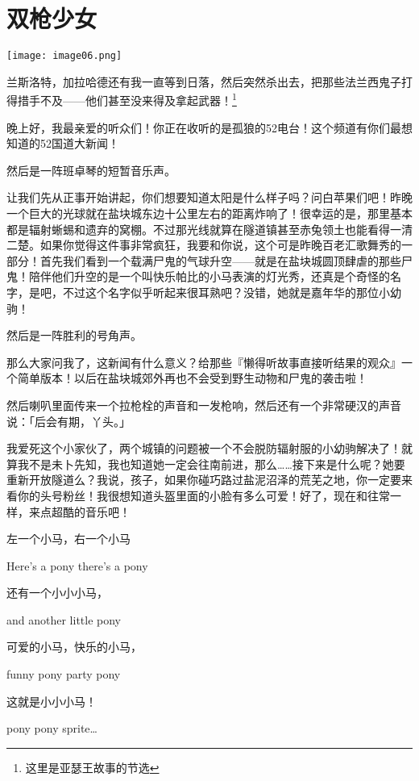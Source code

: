 \chapter{双枪少女}

\texttt{[image: image06.png]}


\begin{intro}
    兰斯洛特，加拉哈德还有我一直等到日落，然后突然杀出去，把那些法兰西鬼子打得措手不及——他们甚至没来得及拿起武器！\footnote{这里是亚瑟王故事的节选}
\end{intro}

{\rt 晚上好，我最亲爱的听众们！你正在收听的是孤狼的52电台！这个频道有你们最想知道的52国道大新闻！}

然后是一阵班卓琴的短暂音乐声。

{\rt 让我们先从正事开始讲起，你们想要知道太阳是什么样子吗？问白苹果们吧！昨晚一个巨大的光球就在盐块城东边十公里左右的距离炸响了！很幸运的是，那里基本都是辐射蜥蜴和遗弃的窝棚。不过那光线就算在隧道镇甚至赤兔领土也能看得一清二楚。如果你觉得这件事非常疯狂，我要和你说，这个可是昨晚百老汇歌舞秀的一部分！首先我们看到一个载满尸鬼的气球升空——就是在盐块城圆顶肆虐的那些尸鬼！陪伴他们升空的是一个叫快乐帕比的小马表演的灯光秀，还真是个奇怪的名字，是吧，不过这个名字似乎听起来很耳熟吧？没错，她就是嘉年华的那位小幼驹！}

然后是一阵胜利的号角声。

{\rt 那么大家问我了，这新闻有什么意义？给那些『懒得听故事直接听结果的观众』一个简单版本！以后在盐块城郊外再也不会受到野生动物和尸鬼的袭击啦！}

然后喇叭里面传来一个拉枪栓的声音和一发枪响，然后还有一个非常硬汉的声音说：「{\rt 后会有期，丫头。}」

{\rt 我爱死这个小家伙了，两个城镇的问题被一个不会脱防辐射服的小幼驹解决了！就算我不是未卜先知，我也知道她一定会往南前进，那么……接下来是什么呢？她要重新开放隧道么？我说，孩子，如果你碰巧路过盐泥沼泽的荒芜之地，你一定要来看你的头号粉丝！我很想知道头盔里面的小脸有多么可爱！好了，现在和往常一样，来点超酷的音乐吧！}

\begin{song}
左一个小马，右一个小马

Here's a pony there's a pony

\medskip

还有一个小小小马，

and another little pony

\medskip

可爱的小马，快乐的小马，

funny pony party pony

\medskip

这就是小小小马！

pony pony sprite\dots
\end{song}

